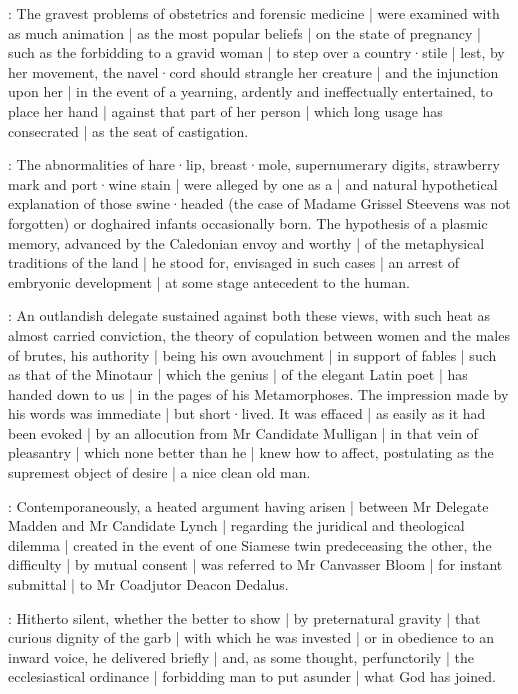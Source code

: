 :
The gravest problems of obstetrics and forensic medicine |
were examined with as much animation |
as the most popular beliefs |
on the state of pregnancy |
such as the forbidding to a gravid woman |
to step over a country·stile |
lest,
by her movement,
the navel·cord should strangle her creature |
and the injunction upon her |
in the event of a yearning,
ardently and ineffectually entertained,
to place her hand |
against that part of her person |
which long usage has consecrated |
as the seat of castigation.

:
The abnormalities of hare·lip,
breast·mole,
supernumerary digits,
strawberry mark and port·wine stain |
were alleged by one as a  |
and natural hypothetical explanation of those swine·headed
(the case of Madame Grissel Steevens was not forgotten)
or doghaired infants occasionally born.
The hypothesis of a plasmic memory,
advanced by the Caledonian envoy and worthy |
of the metaphysical traditions of the land |
he stood for,
envisaged in such cases |
an arrest of embryonic development |
at some stage antecedent to the human.

:
An outlandish delegate sustained against both these views,
with such heat as almost carried conviction,
the theory of copulation between women and the males of brutes,
his authority |
being his own avouchment |
in support of fables |
such as that of the Minotaur |
which the genius |
of the elegant Latin poet |
has handed down to us |
in the pages of his Metamorphoses.
The impression made by his words was immediate |
but short·lived.
It was effaced |
as easily as it had been evoked |
by an allocution from Mr Candidate Mulligan |
in that vein of pleasantry |
which none better than he |
knew how to affect,
postulating as the supremest object of desire |
a nice clean old man.

:
Contemporaneously,
a heated argument having arisen |
between Mr Delegate Madden and Mr Candidate Lynch |
regarding the juridical and theological dilemma |
created in the event of one Siamese twin predeceasing the other,
the difficulty |
by mutual consent |
was referred to Mr Canvasser Bloom |
for instant submittal |
to Mr Coadjutor Deacon Dedalus.

:
Hitherto silent,
whether the better to show |
by preternatural gravity |
that curious dignity of the garb |
with which he was invested |
or in obedience to an inward voice,
he delivered briefly |
and,
as some thought,
perfunctorily |
the ecclesiastical ordinance |
forbidding man to put asunder |
what God has joined.

